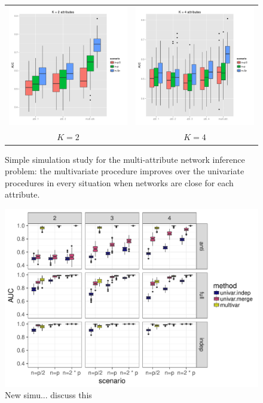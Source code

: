 \begin{figure}[htbp!]
  \centering
  \begin{tabular}{cc}
    \includegraphics[width=.495\textwidth]{figures/res_simu_K=2} &
    \includegraphics[width=.495\textwidth]{figures/res_simu_K=4} \\[1ex]
    $K = 2$ & $K = 4$\\ 
  \end{tabular}

  \caption{Simple  simulation study  for  the multi-attribute  network
    inference problem:  the multivariate  procedure improves  over the
    univariate procedures in every  situation when networks are close
    for each attribute.}
  \label{fig:simu_multi}
\end{figure}

\begin{figure}[htbp!]
  \centering
  \includegraphics[width=\textwidth]{figures/res_simu_new}

  \caption{New simu... discuss this}
  \label{fig:simu_multi}
\end{figure}
